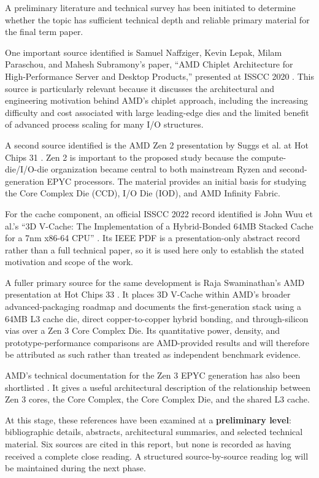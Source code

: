 \documentclass[12pt,a4paper,twoside]{article}
\begin{document}
A preliminary literature and technical survey has been initiated to determine whether the topic has sufficient technical depth and reliable primary material for the final term paper.

One important source identified is Samuel Naffziger, Kevin Lepak, Milam Paraschou, and Mahesh Subramony's paper, ``AMD Chiplet Architecture for High-Performance Server and Desktop Products,'' presented at ISSCC 2020 \cite{naffziger2020chiplet}. This source is particularly relevant because it discusses the architectural and engineering motivation behind AMD's chiplet approach, including the increasing difficulty and cost associated with large leading-edge dies and the limited benefit of advanced process scaling for many I/O structures.

A second source identified is the AMD Zen 2 presentation by Suggs et al. at Hot Chips 31 \cite{suggs2019zen2}. Zen 2 is important to the proposed study because the compute-die/I/O-die organization became central to both mainstream Ryzen and second-generation EPYC processors. The material provides an initial basis for studying the Core Complex Die (CCD), I/O Die (IOD), and AMD Infinity Fabric.

For the cache component, an official ISSCC 2022 record identified is John Wuu et al.'s ``3D V-Cache: The Implementation of a Hybrid-Bonded 64MB Stacked Cache for a 7nm x86-64 CPU'' \cite{wuu2022vcache}. Its IEEE PDF is a presentation-only abstract record rather than a full technical paper, so it is used here only to establish the stated motivation and scope of the work.

A fuller primary source for the same development is Raja Swaminathan's AMD presentation at Hot Chips 33 \cite{swaminathanAdvancedPackagingEnabling2021}. It places 3D V-Cache within AMD's broader advanced-packaging roadmap and documents the first-generation stack using a 64MB L3 cache die, direct copper-to-copper hybrid bonding, and through-silicon vias over a Zen 3 Core Complex Die. Its quantitative power, density, and prototype-performance comparisons are AMD-provided results and will therefore be attributed as such rather than treated as independent benchmark evidence.

AMD's technical documentation for the Zen 3 EPYC generation has also been shortlisted \cite{amd2022epyc7003}. It gives a useful architectural description of the relationship between Zen 3 cores, the Core Complex, the Core Complex Die, and the shared L3 cache.

At this stage, these references have been examined at a \textbf{preliminary level}: bibliographic details, abstracts, architectural summaries, and selected technical material. Six sources are cited in this report, but none is recorded as having received a complete close reading. A structured source-by-source reading log will be maintained during the next phase.
\end{document}
